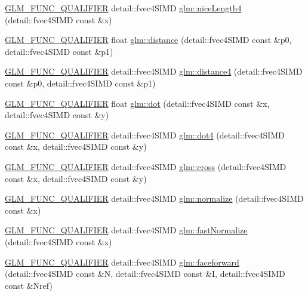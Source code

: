 \begin{DoxyCompactItemize}
\hyperlink{setup_8hpp_a33fdea6f91c5f834105f7415e2a64407}{G\+L\+M\+\_\+\+F\+U\+N\+C\+\_\+\+Q\+U\+A\+L\+I\+F\+I\+ER} detail\+::fvec4\+S\+I\+MD \hyperlink{namespaceglm_a8279db21d38cadc5efaa0c8efababb1b}{glm\+::nice\+Length4} (detail\+::fvec4\+S\+I\+MD const \&x)
\item 
\hyperlink{setup_8hpp_a33fdea6f91c5f834105f7415e2a64407}{G\+L\+M\+\_\+\+F\+U\+N\+C\+\_\+\+Q\+U\+A\+L\+I\+F\+I\+ER} float \hyperlink{namespaceglm_ae716903872179576658f5eb6e2632558}{glm\+::distance} (detail\+::fvec4\+S\+I\+MD const \&p0, detail\+::fvec4\+S\+I\+MD const \&p1)
\item 
\hyperlink{setup_8hpp_a33fdea6f91c5f834105f7415e2a64407}{G\+L\+M\+\_\+\+F\+U\+N\+C\+\_\+\+Q\+U\+A\+L\+I\+F\+I\+ER} detail\+::fvec4\+S\+I\+MD \hyperlink{namespaceglm_a5256e6d2d2a82b810f92fc02f64819fb}{glm\+::distance4} (detail\+::fvec4\+S\+I\+MD const \&p0, detail\+::fvec4\+S\+I\+MD const \&p1)
\item 
\hyperlink{setup_8hpp_a33fdea6f91c5f834105f7415e2a64407}{G\+L\+M\+\_\+\+F\+U\+N\+C\+\_\+\+Q\+U\+A\+L\+I\+F\+I\+ER} float \hyperlink{namespaceglm_ae84ca0b0e48c6a79faac0eea8bc7a913}{glm\+::dot} (detail\+::fvec4\+S\+I\+MD const \&x, detail\+::fvec4\+S\+I\+MD const \&y)
\item 
\hyperlink{setup_8hpp_a33fdea6f91c5f834105f7415e2a64407}{G\+L\+M\+\_\+\+F\+U\+N\+C\+\_\+\+Q\+U\+A\+L\+I\+F\+I\+ER} detail\+::fvec4\+S\+I\+MD \hyperlink{namespaceglm_af55916a3764adaa7537f5e3e9ccacb81}{glm\+::dot4} (detail\+::fvec4\+S\+I\+MD const \&x, detail\+::fvec4\+S\+I\+MD const \&y)
\item 
\hyperlink{setup_8hpp_a33fdea6f91c5f834105f7415e2a64407}{G\+L\+M\+\_\+\+F\+U\+N\+C\+\_\+\+Q\+U\+A\+L\+I\+F\+I\+ER} detail\+::fvec4\+S\+I\+MD \hyperlink{namespaceglm_a06a52dedca29da951493c4c6f6020573}{glm\+::cross} (detail\+::fvec4\+S\+I\+MD const \&x, detail\+::fvec4\+S\+I\+MD const \&y)
\item 
\hyperlink{setup_8hpp_a33fdea6f91c5f834105f7415e2a64407}{G\+L\+M\+\_\+\+F\+U\+N\+C\+\_\+\+Q\+U\+A\+L\+I\+F\+I\+ER} detail\+::fvec4\+S\+I\+MD \hyperlink{namespaceglm_aabe6e7b8dbd2e5db215f973e474dd951}{glm\+::normalize} (detail\+::fvec4\+S\+I\+MD const \&x)
\item 
\hyperlink{setup_8hpp_a33fdea6f91c5f834105f7415e2a64407}{G\+L\+M\+\_\+\+F\+U\+N\+C\+\_\+\+Q\+U\+A\+L\+I\+F\+I\+ER} detail\+::fvec4\+S\+I\+MD \hyperlink{namespaceglm_a28640ee202fdb12ef3e836c257675043}{glm\+::fast\+Normalize} (detail\+::fvec4\+S\+I\+MD const \&x)
\item 
\hyperlink{setup_8hpp_a33fdea6f91c5f834105f7415e2a64407}{G\+L\+M\+\_\+\+F\+U\+N\+C\+\_\+\+Q\+U\+A\+L\+I\+F\+I\+ER} detail\+::fvec4\+S\+I\+MD \hyperlink{namespaceglm_ae3d9637fb22cf7eecd448c5ad341efab}{glm\+::faceforward} (detail\+::fvec4\+S\+I\+MD const \&N, detail\+::fvec4\+S\+I\+MD const \&I, detail\+::fvec4\+S\+I\+MD const \&Nref)

\end{DoxyCompactItemize}
